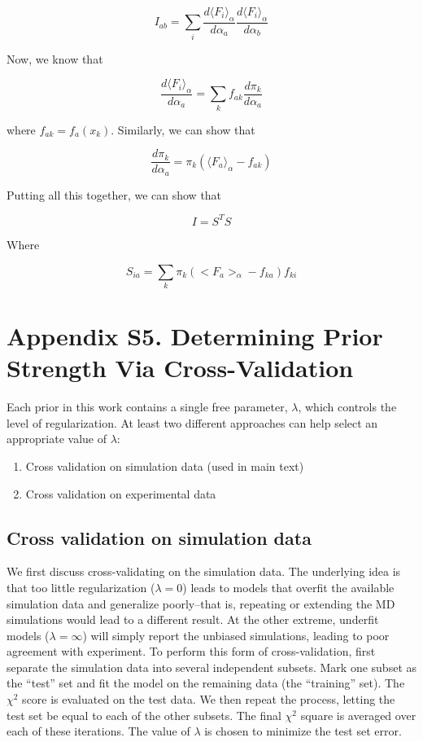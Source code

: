 \documentclass[12pt]{article}
\begin{document}
$$I_{ab} = \sum_{i} \frac{d\langle F_i \rangle_\alpha}{d\alpha_a} \frac{d\langle F_i \rangle_\alpha}{d\alpha_b} $$

Now, we know that 

$$\frac{d\langle F_i \rangle_\alpha}{d\alpha_a} = \sum_k f_{ak} \frac{d\pi_k}{d\alpha_a}$$

where $f_{ak} = f_a(x_k)$.  Similarly, we can show that

$$\frac{d\pi_k}{d\alpha_a} = \pi_k (\langle F_a \rangle_{\alpha} - f_{ak})$$


Putting all this together, we can show that

$$I = S^T S$$

Where 

$$S_{ia} = \sum_k \pi_k (<F_a>_\alpha - f_{ka}) f_{ki}$$

\newpage

\section*{Appendix S5.  Determining Prior Strength Via Cross-Validation}

Each prior in this work contains a single free parameter, $\lambda$, which controls the level of regularization.  At least two different approaches can help select an appropriate value of $\lambda$:

\begin{enumerate}
 \item Cross validation on simulation data (used in main text)
 \item Cross validation on experimental data
\end{enumerate}

\subsection*{Cross validation on simulation data}

We first discuss cross-validating on the simulation data.  The underlying idea is that too little regularization ($\lambda = 0$) leads to models that overfit the available simulation data and generalize poorly--that is, repeating or extending the MD simulations would lead to a different result.  At the other extreme, underfit models ($\lambda = \infty$) will simply report the unbiased simulations, leading to poor agreement with experiment.  To perform this form of cross-validation, first separate the simulation data into several independent subsets.  Mark one subset as the ``test'' set and fit the model on the remaining data (the ``training'' set).  The $\chi^2$ score is evaluated on the test data.  We then repeat the process, letting the test set be equal to each of the other subsets.  The final $\chi^2$ square is averaged over each of these iterations.  The value of $\lambda$ is chosen to minimize the test set error.
\end{document}
